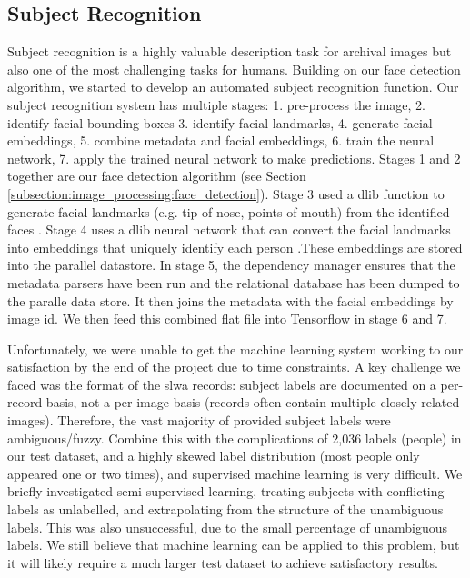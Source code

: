 \documentclass[10pt, a4paper]{article}
\begin{document}
\subsection{Subject Recognition}
\label{subsection:machine_learning:subject_recognition}
Subject recognition is a highly valuable description task for archival images but also one of the most challenging tasks for humans. Building on our face detection algorithm, we started to develop an automated subject recognition function. Our subject recognition system has multiple stages: 1. pre-process the image, 2. identify facial bounding boxes 3. identify facial landmarks, 4. generate facial embeddings, 5. combine metadata and facial embeddings, 6. train the neural network, 7. apply the trained neural network to make predictions. Stages 1 and 2 together are our face detection algorithm (see Section \ref{subsection:image_processing:face_detection}). Stage 3 used a dlib function to generate facial landmarks (e.g. tip of nose, points of mouth) from the identified faces \cite{dlib_face}. Stage 4 uses a dlib neural network that can convert the facial landmarks into embeddings that uniquely identify each person \cite{he2016}.These embeddings are stored into the parallel datastore. In stage 5, the dependency manager ensures that the metadata parsers have been run and the relational database has been dumped to the paralle data store. It then joins the metadata with the facial embeddings by image id. We then feed this combined flat file into Tensorflow in stage 6 and 7.

Unfortunately, we were unable to get the machine learning system working to our satisfaction by the end of the project due to time constraints. A key challenge we faced was the format of the \Gls{slwa} records: subject labels are documented on a per-record basis, not a per-image basis (records often contain multiple closely-related images). Therefore, the vast majority of provided subject labels were ambiguous/fuzzy. Combine this with the complications of 2,036 labels (people) in our test dataset, and a highly skewed label distribution (most people only appeared one or two times), and supervised machine learning is very difficult. We briefly investigated semi-supervised learning, treating subjects with conflicting labels as unlabelled, and extrapolating from the structure of the unambiguous labels. This was also unsuccessful, due to the small percentage of unambiguous labels. We still believe that machine learning can be applied to this problem, but it will likely require a much larger test dataset to achieve satisfactory results.
\end{document}
